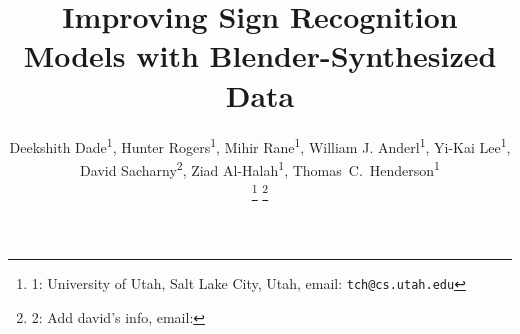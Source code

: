 \documentclass[journal]{IEEEtran}
\begin{document}
%
\title{Improving Sign Recognition Models with Blender-Synthesized Data}
%
%
%

\author{
    Deekshith Dade\textsuperscript{1},
    Hunter Rogers\textsuperscript{1},
    Mihir Rane\textsuperscript{1},
    William J. Anderl\textsuperscript{1},
    Yi-Kai Lee\textsuperscript{1},
    David Sacharny\textsuperscript{2},
    Ziad Al-Halah\textsuperscript{1},
    Thomas~C.~Henderson\textsuperscript{1}
    
    \thanks{1: University of Utah, Salt Lake City, Utah, email: \tt\small tch@cs.utah.edu}
    \thanks{2: Add david's info, email: }
}



% 
%
\end{document}
